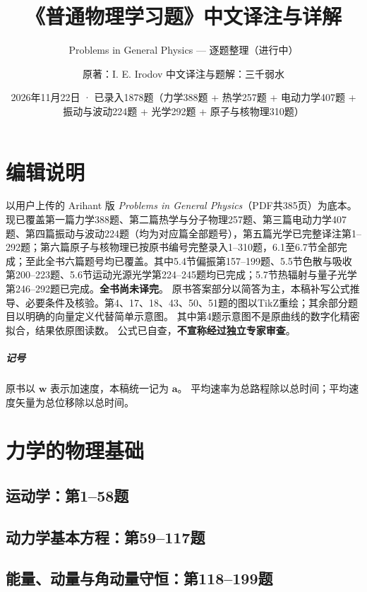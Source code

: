 \documentclass[lang=cn,color=blue,11pt]{elegantbook}
\title{《普通物理学习题》中文译注与详解}
\subtitle{Problems in General Physics --- 逐题整理（进行中）}
\author{原著：I. E. Irodov \quad 中文译注与题解：三千弱水}
\date{2026年11月22日 · 已录入1878题（力学388题 + 热学257题 + 电动力学407题 + 振动与波动224题 + 光学292题 + 原子与核物理310题）}
\begin{document}
\maketitle
\frontmatter
\chapter*{编辑说明}
以用户上传的 Arihant 版 \emph{Problems in General Physics}（PDF共385页）为底本。
现已覆盖第一篇力学388题、第二篇热学与分子物理257题、第三篇电动力学407题、第四篇振动与波动224题（均为对应篇全部题号），第五篇光学已完整译注第1--292题；第六篇原子与核物理已按原书编号完整录入1--310题，6.1至6.7节全部完成；至此全书六篇题号均已覆盖。其中5.4节偏振第157--199题、5.5节色散与吸收第200--223题、5.6节运动光源光学第224--245题均已完成；5.7节热辐射与量子光学第246--292题已完成。\textbf{全书尚未译完}。
原书答案部分以简答为主，本稿补写公式推导、必要条件及核验。第4、17、18、43、50、51题的图以TikZ重绘；其余部分题目以明确的向量定义代替简单示意图。
其中第4题示意图不是原曲线的数字化精密拟合，结果依原图读数。
公式已自查，\textbf{不宣称经过独立专家审查}。
\paragraph{记号}
原书以 $\bm w$ 表示加速度，本稿统一记为 $\bm a$。
平均速率为总路程除以总时间；平均速度矢量为总位移除以总时间。
\tableofcontents
\mainmatter
\chapter{力学的物理基础}
\section{运动学：第1--58题}





\section{动力学基本方程：第59--117题}






\section{能量、动量与角动量守恒：第118--199题}

\end{document}
